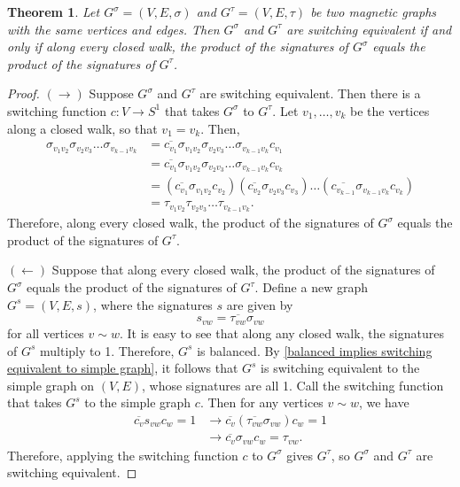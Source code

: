 \documentclass[12pt]{article}
\newtheorem{thm}{Theorem}
\theoremstyle{definition}
\begin{document}
\begin{thm}\label{closed walk characterization of switching equivalence}
Let $G^\sigma = (V, E, \sigma)$ and $G^\tau = (V, E, \tau)$ be two magnetic graphs with the same vertices and edges. Then $G^\sigma$ and $G^\tau$ are switching equivalent if and only if along every closed walk, the product of the signatures of $G^\sigma$ equals the product of the signatures of $G^\tau$.
\end{thm}
\begin{proof}
$(\rightarrow)$ Suppose $G^\sigma$ and $G^\tau$ are switching equivalent. Then there is a switching function $c: V \rightarrow S^1$ that takes $G^\sigma$ to $G^\tau$. Let $v_1, \dots, v_k$ be the vertices along a closed walk, so that $v_1 = v_k$. Then,
\begin{align*}
\sigma_{v_1 v_2} \sigma_{v_2 v_3} \dots \sigma_{v_{k-1} v_k}
&= \overline{c_{v_1}} \sigma_{v_1 v_2} \sigma_{v_2 v_3} \dots \sigma_{v_{k-1} v_k} c_{v_1} \\
&= \overline{c_{v_1}} \sigma_{v_1 v_2} \sigma_{v_2 v_3} \dots \sigma_{v_{k-1} v_k} c_{v_k} \\
&= (\overline{c_{v_1}} \sigma_{v_1 v_2} c_{v_2}) (\overline{c_{v_2}} \sigma_{v_2 v_3} c_{v_3}) \dots (\overline{c_{v_{k-1}}} \sigma_{v_{k-1} v_k} c_{v_k}) \\
&= \tau_{v_1 v_2} \tau_{v_2 v_3} \dots \tau_{v_{k-1} v_k}.
\end{align*} 
Therefore, along every closed walk, the product of the signatures of $G^\sigma$ equals the product of the signatures of $G^\tau$.

$(\leftarrow)$ Suppose that along every closed walk, the product of the signatures of $G^\sigma$ equals the product of the signatures of $G^\tau$. Define a new graph $G^s = (V, E, s)$, where the signatures $s$ are given by 
$$s_{vw} = \overline{\tau_{vw}} \sigma_{vw}$$ 
for all vertices $v \sim w$. It is easy to see that along any closed walk, the signatures of $G^s$ multiply to 1. Therefore, $G^s$ is balanced. By \cref{balanced implies switching equivalent to simple graph}, it follows that $G^s$ is switching equivalent to the simple graph on $(V, E)$, whose signatures are all 1. Call the switching function that takes $G^s$ to the simple graph $c$. Then for any vertices $v \sim w$, we have
\begin{align*}
\overline{c_v} s_{vw} c_w = 1
&\rightarrow \overline{c_v} \left(\overline{\tau_{vw}} \sigma_{vw}\right) c_w = 1 \\
&\rightarrow \overline{c_v} \sigma_{vw} c_w = \tau_{vw}.
\end{align*}
Therefore, applying the switching function $c$ to $G^\sigma$ gives $G^\tau$, so $G^\sigma$ and $G^\tau$ are switching equivalent.
\end{proof}
\end{document}
